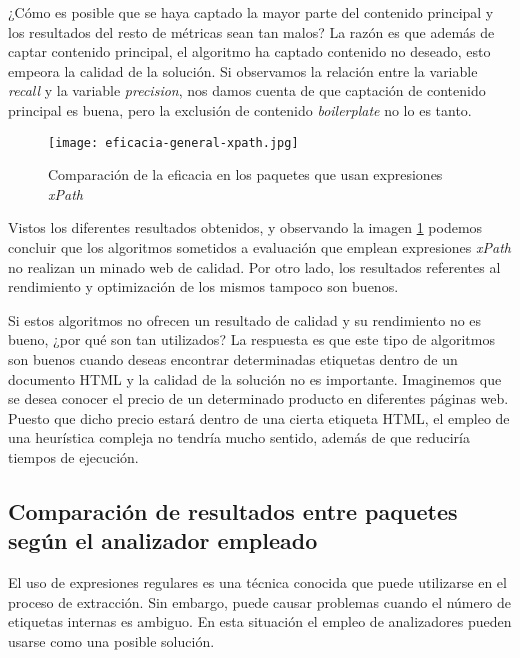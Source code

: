 ¿Cómo es posible que se haya captado la mayor parte del contenido principal y los resultados del resto de
métricas sean tan malos? La razón es que además de captar contenido principal, el algoritmo ha captado
contenido no deseado, esto empeora la calidad de la solución. Si observamos la relación entre la variable
\emph{recall} y la variable \emph{precision}, nos damos cuenta de que captación de contenido principal es
buena, pero la exclusión de contenido \emph{boilerplate} no lo es tanto.

\begin{figure}[tphb]
    \centering
    \texttt{[image: eficacia-general-xpath.jpg]}
    \caption{Comparación de la eficacia en los paquetes que usan expresiones \emph{xPath}}
    \label{img:comparacion de la eficacia en los paquetes que usan expresiones xPath}
\end{figure}

Vistos los diferentes resultados obtenidos, y observando la imagen 
\ref{img:comparacion de la eficacia en los paquetes que usan expresiones xPath} podemos concluir que los 
algoritmos sometidos a evaluación que emplean expresiones \emph{xPath} no realizan un minado web de calidad. 
Por otro lado, los resultados referentes al rendimiento y optimización de los mismos tampoco son buenos.

Si estos algoritmos no ofrecen un resultado de calidad y su rendimiento no es bueno, ¿por qué son tan
utilizados? La respuesta es que este tipo de algoritmos son buenos cuando deseas encontrar determinadas
etiquetas dentro de un documento HTML y la calidad de la solución no es importante. Imaginemos que se desea
conocer el precio de un determinado producto en diferentes páginas web. Puesto que dicho precio estará
dentro de una cierta etiqueta HTML, el empleo de una heurística compleja no tendría mucho sentido, además
de que reduciría tiempos de ejecución.

\subsection{Comparación de resultados entre paquetes según el analizador empleado}
\label{subsec:comparacion de resultados entre paquetes segun el analizador empleado}

El uso de expresiones regulares es una técnica conocida que puede utilizarse en el proceso de extracción.
Sin embargo, puede causar problemas cuando el número de etiquetas internas es ambiguo. En esta situación
el empleo de analizadores pueden usarse como una posible solución.

